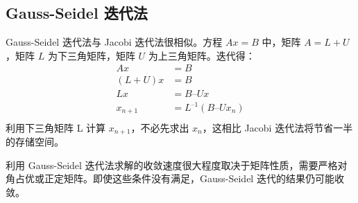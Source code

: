 \subsection{Gauss-Seidel 迭代法}
Gauss-Seidel 迭代法与 Jacobi 迭代法很相似。方程 $Ax = B$ 中，矩阵 $A = L + U$，矩阵 $L$ 为下三角矩阵，矩阵 $U$ 为上三角矩阵。迭代得：
\begin{equation}
    \begin{aligned}
        Ax       & = B                \\
        (L + U)x & = B                \\
        Lx       & = B – Ux           \\
        x_{n+1}  & = L^{–1}(B – Ux_n) \\
    \end{aligned}
\end{equation}
利用下三角矩阵 L 计算 $x_{n+1}$，不必先求出 $x_n$，这相比 Jacobi 迭代法将节省一半的存储空间。

利用 Gauss-Seidel 迭代法求解的收敛速度很大程度取决于矩阵性质，需要严格对角占优或正定矩阵。即使这些条件没有满足，Gauss-Seidel 迭代的结果仍可能收敛。